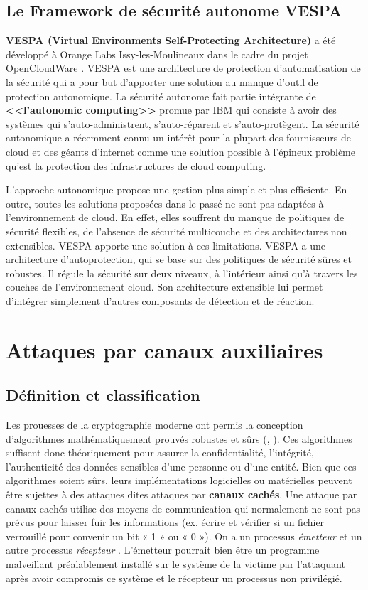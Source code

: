 \subsection{Le Framework de sécurité autonome VESPA} 
\textbf{ VESPA (Virtual Environments Self-Protecting Architecture)} \cite{Vespa} a été développé à Orange Labs Issy-les-Moulineaux dans le cadre du projet OpenCloudWare \cite{OpenCloudWare}. VESPA est une architecture de protection d'automatisation de la sécurité qui a pour but d’apporter une solution au manque d’outil de protection autonomique.  La sécurité autonome fait partie intégrante de \textbf{ <<l’autonomic computing>>} promue par IBM \cite{ibm}qui consiste à avoir des systèmes qui s’auto-administrent, s’auto-réparent et s’auto-protègent. La sécurité autonomique  a récemment connu un intérêt pour la plupart des fournisseurs de cloud et des géants d’internet comme une solution possible à l’épineux problème qu’est la protection des infrastructures de cloud computing.
\par L’approche autonomique propose une gestion plus simple et plus efficiente. En outre, toutes les solutions proposées dans le passé ne sont pas adaptées à l’environnement de cloud. En effet, elles souffrent du manque de politiques de sécurité flexibles, de l’absence de sécurité multicouche et  des architectures non extensibles.  VESPA  apporte une solution à  ces limitations. VESPA  a une architecture d’autoprotection,  qui se base sur des politiques de sécurité sûres et robustes. Il régule la sécurité sur deux niveaux, à l’intérieur ainsi qu’à travers les couches de l’environnement cloud. Son architecture extensible lui  permet d’intégrer simplement d’autres composants de détection et de réaction.  
          
\section{Attaques par canaux auxiliaires} 
\subsection{Définition et classification}
     
Les prouesses de la cryptographie moderne ont permis la conception d’algorithmes mathématiquement  prouvés robustes et sûrs (\cite{Kocher}, \cite{Rsapaper}). Ces algorithmes suffisent  donc théoriquement  pour assurer  la confidentialité, l’intégrité, l’authenticité des données sensibles d’une  personne ou d’une entité. Bien que ces algorithmes soient sûrs, leurs implémentations logicielles ou matérielles peuvent être sujettes à des attaques dites attaques par \textbf{canaux cachés}. Une attaque par canaux cachés  utilise des moyens de communication qui normalement  ne sont pas prévus  pour laisser fuir les informations \cite{Covert}(ex. écrire et vérifier si  un fichier verrouillé pour convenir un bit « 1 » ou « 0 »). On a un processus \textit{émetteur} et un autre processus \textit{récepteur} . L’émetteur pourrait bien être  un programme malveillant préalablement installé sur le système de la victime  par l’attaquant après avoir compromis ce système et le récepteur un processus non privilégié. \newline{}

